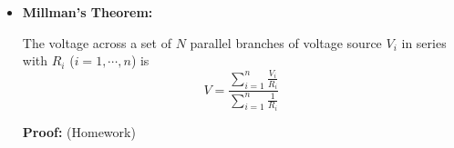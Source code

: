 \begin{itemize}
\begin{comment}
To show this, we assume the source network is converted to a voltage
source with $V_0$ and $R_0$, and use two different loads $R_1$ and
$R_2$ with
\[ I_1=\frac{V_0}{R_0+R_1},\;\;\;\;V_1=V_0\;\frac{R_1}{R_0+R_1},\;\;\;\;
   I_2=\frac{V_0}{R_0+R_2},\;\;\;\;V_2=V_0\;\frac{R_2}{R_0+R_2} \]
and
\[ 
\triangle I=I_1-I_2=V_0\;\left(\frac{1}{R_0+R_1}-\frac{1}{R_0+R_2}\right),
\;\;\;   \triangle V=V_1-V_2=V_0\;\left(\frac{R_1}{R_0+R_1}-\frac{R_2}{R_0+R_2}\right)
\]
The output resistance can therefore be found to be $R_0$ as expected:
\[ -\frac{\triangle V}{\triangle I}=-\frac{V_1-V_2}{I_1-I_2}=R_0 \]

Consider two extreme cases for the two loads $R_1$ and $R_2$:
\begin{itemize}
\item when $R_1=0$ (short-circuit), then we get the short-circuit 
  current: 
  \[ I_1=I_{sc}=V_0/R_0,\;\;\;\;\;\; V_1=0 \]
\item when $R_2=\infty$ (open-circuit), then we get the open-circuit
  voltage: 
  \[ V_2=V_{oc}=V_0,\;\;\;\;\;\;\;I_2=0 \]
\end{itemize}
and we have $\triangle V=V_1-V_2=-V_0$, $\triangle I=V_1-V_2=V_0/R_0$,
and the output resistance is found to be:
\[ R_0=-\frac{\triangle V}{\triangle I}=\frac{V_{oc}}{I_{sc}} \]

\end{comment}

\item {\bf Millman's Theorem:}

The voltage across a set of $N$ parallel branches of voltage source 
$V_i$ in series with $R_i$ ($i=1,\cdots,n$) is
\[
V=\frac{\sum_{i=1}^n \frac{V_i}{R_i}}{\sum_{i=1}^n\frac{1}{R_i}}
\]

{\bf Proof:} (Homework)

\begin{comment}
Consider applying Norton's theorem to the circuit. The short-circuit current 
of these parallel branches can be found to be (superposition):
\[
I_{sc}=\sum_{i=1}^n\frac{V_i}{R_i}
\]
and the total internal resistance is simply the parallel combination of the
branch resistances:
\[
R_0=\left(\sum_{i=1}^n\frac{1}{R_i}\right)^{-1}
\]
Therefore the open-circuit voltage across these branches is 
\[
V_{oc}=I_{sc} R_0=\left(\sum_{i=1}^n\frac{V_i}{R_i}\right)\left(\sum_{i=1}^n\frac{1}{R_i}\right)^{-1}
=\frac{\sum_{i=1}^n\frac{V_i}{R_i}}{\sum_{i=1}^n\frac{1}{R_i}}
\]
\end{comment}



\end{itemize}
